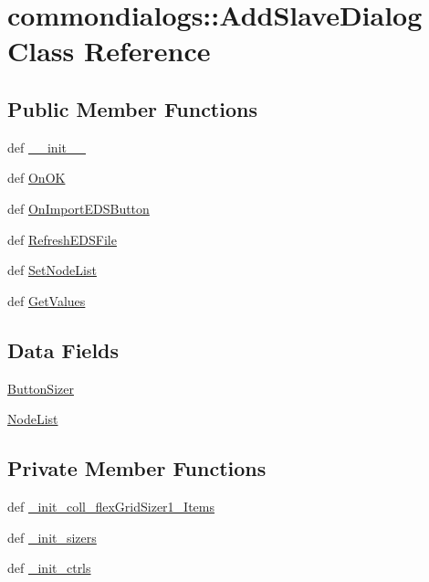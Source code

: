 \hypertarget{classcommondialogs_1_1AddSlaveDialog}{
\section{commondialogs::Add\-Slave\-Dialog Class Reference}
\label{classcommondialogs_1_1AddSlaveDialog}
}
\subsection*{Public Member Functions}
\begin{CompactItemize}
\item 
def \hyperlink{classcommondialogs_1_1AddSlaveDialog_b104177c85484b33a3ef22eab6e55268}{\_\-\_\-init\_\-\_\-}
\item 
def \hyperlink{classcommondialogs_1_1AddSlaveDialog_d8788a0255709742043cb758b8e4093d}{On\-OK}
\item 
def \hyperlink{classcommondialogs_1_1AddSlaveDialog_c5d8179971eff35728972924949a4423}{On\-Import\-EDSButton}
\item 
def \hyperlink{classcommondialogs_1_1AddSlaveDialog_7db65b205229e136495f5e98f16aef72}{Refresh\-EDSFile}
\item 
def \hyperlink{classcommondialogs_1_1AddSlaveDialog_70e8955dbb57253e53d28f24a7f28da4}{Set\-Node\-List}
\item 
def \hyperlink{classcommondialogs_1_1AddSlaveDialog_0211d3e7bd98931e9426f587b7956d5b}{Get\-Values}
\end{CompactItemize}
\subsection*{Data Fields}
\begin{CompactItemize}
\item 
\hyperlink{classcommondialogs_1_1AddSlaveDialog_547ce8f618541a9a84f69d2c64c2f113}{Button\-Sizer}
\item 
\hyperlink{classcommondialogs_1_1AddSlaveDialog_74c3506f4b1c4fa83d88c013eed6c727}{Node\-List}
\end{CompactItemize}
\subsection*{Private Member Functions}
\begin{CompactItemize}
\item 
def \hyperlink{classcommondialogs_1_1AddSlaveDialog_881e5f01c3bc7205cd81618e99e97bb7}{\_\-init\_\-coll\_\-flex\-Grid\-Sizer1\_\-Items}
\item 
def \hyperlink{classcommondialogs_1_1AddSlaveDialog_28596c6fdb967515e753e4ba2f3cbbba}{\_\-init\_\-sizers}
\item 
def \hyperlink{classcommondialogs_1_1AddSlaveDialog_1fe2e9fa83c9201e4939cbe28ea70f3d}{\_\-init\_\-ctrls}
\end{CompactItemize}


